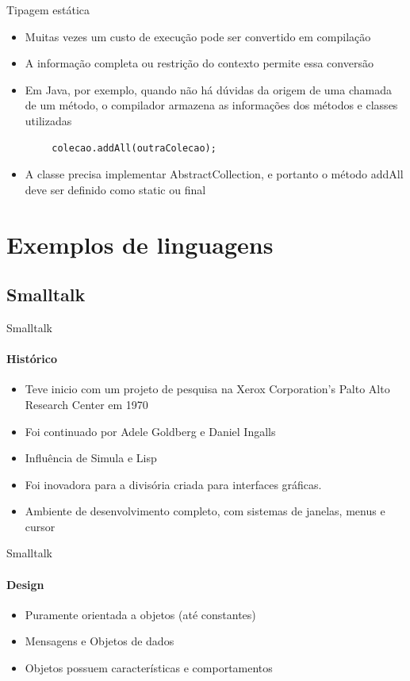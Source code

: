 \begin{frame}[fragile]{Tipagem estática}
\begin{itemize}
    \item Muitas vezes um custo de execução pode ser convertido em compilação
    \item A informação completa ou restrição do contexto permite essa conversão
    \item Em Java, por exemplo, quando não há dúvidas da origem de uma chamada de um método, o compilador armazena as informações dos métodos e classes utilizadas
\end{itemize}
\begin{verbatim}
        colecao.addAll(outraColecao);
\end{verbatim}
\begin{itemize}
    \item A classe precisa implementar AbstractCollection, e portanto o método addAll deve ser definido como static ou final
\end{itemize}
\end{frame}

\section{Exemplos de linguagens}

\subsection{Smalltalk}

\begin{frame}{Smalltalk}
\framesubtitle{Histórico}
    \begin{itemize}
        \item Teve inicio com um projeto de pesquisa na Xerox Corporation's Palto Alto Research Center em 1970
        \item Foi continuado por Adele Goldberg e Daniel Ingalls
        \item Influência de Simula e Lisp
        \item Foi inovadora para a divisória criada para interfaces gráficas.
        \item Ambiente de desenvolvimento completo, com sistemas de janelas, menus e cursor
    \end{itemize}
\end{frame}

\begin{frame}{Smalltalk}
\framesubtitle{Design}
    \begin{itemize}
        \item Puramente orientada a objetos (até constantes)
        \item Mensagens e Objetos de dados
        \item Objetos possuem características e comportamentos
    \end{itemize}
\end{frame}

